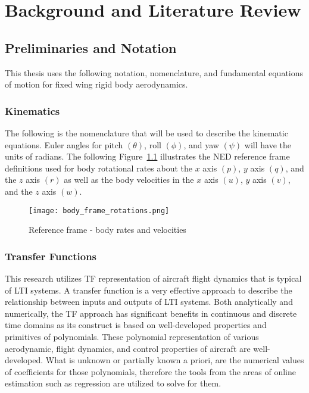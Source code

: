 \chapter{Background and Literature Review}\label{ch:problem}
\section{Preliminaries and Notation}\label{preliminaries}
This thesis uses the following notation, nomenclature, and fundamental equations of motion for fixed wing rigid body aerodynamics.

\subsection{Kinematics}
The following is the nomenclature that will be used to describe the kinematic equations.  Euler angles for pitch $(\theta)$, roll $(\phi)$, and yaw $(\psi)$ will have the units of radians.  The following Figure~\ref{fig:reference_frame} illustrates the \ac{NED} reference frame definitions used for body rotational rates about the $x$ axis $(p)$, $y$ axis $(q)$, and the $z$ axis $(r)$ as well as the body velocities in the $x$ axis $(u)$, $y$ axis $(v)$, and the $z$ axis $(w)$.

\begin{figure}[h!]
 \centering
  \texttt{[image: body\_frame\_rotations.png]}
  \caption{Reference frame - body rates and velocities}
  \label{fig:reference_frame}
\end{figure}

\subsection{Transfer Functions}
This research utilizes \ac{TF} representation of aircraft flight dynamics that is typical of \ac{LTI} systems.  A transfer function is a very effective approach to describe the relationship between inputs and outputs of \ac{LTI} systems.  Both analytically and numerically, the \ac{TF} approach has significant benefits in continuous and discrete time domains as its construct is based on well-developed properties and primitives of polynomials.  These polynomial representation of various aerodynamic, flight dynamics, and control properties of aircraft are well-developed.  What is unknown or partially known a priori, are the numerical values  of coefficients for those polynomials, therefore the tools from the areas of online estimation such as regression are utilized to solve for them.

